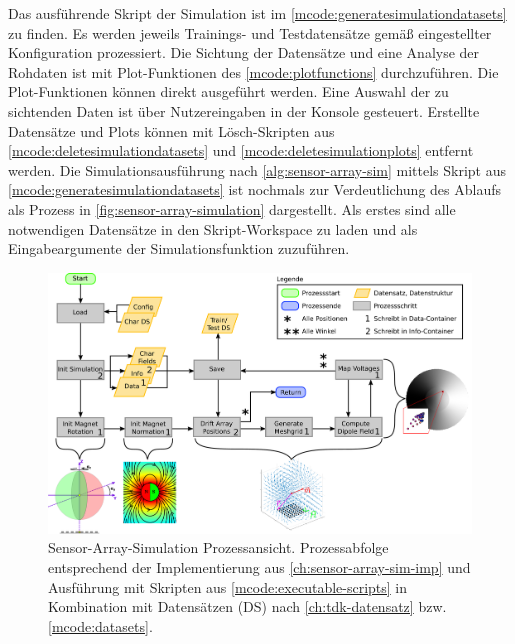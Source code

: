 \clearpage


Das ausführende Skript der Simulation ist im \autoref{mcode:generatesimulationdatasets} zu finden. Es werden jeweils Trainings- und Testdatensätze gemäß eingestellter Konfiguration prozessiert. Die Sichtung der Datensätze und eine Analyse der Rohdaten ist mit Plot-Funktionen des \autoref{mcode:plotfunctions} durchzuführen. Die Plot-Funktionen können direkt ausgeführt werden. Eine Auswahl der zu sichtenden Daten ist über Nutzereingaben in der Konsole gesteuert. Erstellte Datensätze und Plots können mit Lösch-Skripten aus \autoref{mcode:deletesimulationdatasets} und \autoref{mcode:deletesimulationplots} entfernt werden.
\newline
Die Simulationsausführung nach \autoref{alg:sensor-array-sim} mittels Skript aus \autoref{mcode:generatesimulationdatasets} ist nochmals zur Verdeutlichung des Ablaufs als Prozess in \autoref{fig:sensor-array-simulation} dargestellt. Als erstes sind alle notwendigen Datensätze in den Skript-Workspace zu laden und als Eingabeargumente der Simulationsfunktion zuzuführen. 


\vspace{5mm}
\begin{figure}[bph]
	\centering
	\includegraphics[width=\linewidth]{chapters/images/3-SW-E-OExp/Sensor-Array-Simulation}
	\caption[Sensor-Array-Simulation Prozessansicht]{Sensor-Array-Simulation Prozessansicht. Prozessabfolge entsprechend der Implementierung aus \autoref{ch:sensor-array-sim-imp} und Ausführung mit Skripten aus \autoref{mcode:executable-scripts} in Kombination mit Datensätzen (DS) nach \autoref{ch:tdk-datensatz} bzw. \autoref{mcode:datasets}.}
	\label{fig:sensor-array-simulation}
\end{figure}



